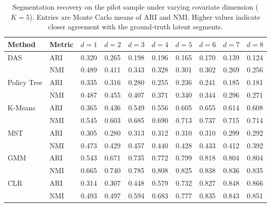 \begin{table}[htbp]
\centering
\caption{Segmentation recovery on the pilot sample under varying covariate dimension ($K=5$). Entries are Monte Carlo means of ARI and NMI. Higher values indicate closer agreement with the ground-truth latent segments.}
\label{tab:app-ari-nmi-varying-d}
\begin{tabular}{llcccccccc}
\toprule
Method & Metric & $d=1$ & $d=2$ & $d=3$ & $d=4$ & $d=5$ & $d=6$ & $d=7$ & $d=8$ \\
\midrule
DAS & ARI & 0.320 & 0.265 & 0.198 & 0.196 & 0.165 & 0.170 & 0.139 & 0.124 \\
 & NMI & 0.489 & 0.411 & 0.343 & 0.328 & 0.301 & 0.302 & 0.269 & 0.256 \\
\addlinespace
Policy Tree & ARI & 0.335 & 0.316 & 0.280 & 0.255 & 0.236 & 0.241 & 0.185 & 0.181 \\
 & NMI & 0.487 & 0.455 & 0.407 & 0.371 & 0.340 & 0.344 & 0.296 & 0.271 \\
\addlinespace
K-Means & ARI & 0.365 & 0.436 & 0.549 & 0.556 & 0.605 & 0.655 & 0.614 & 0.608 \\
 & NMI & 0.545 & 0.603 & 0.685 & 0.690 & 0.713 & 0.737 & 0.715 & 0.714 \\
\addlinespace
MST & ARI & 0.305 & 0.280 & 0.313 & 0.312 & 0.310 & 0.310 & 0.299 & 0.292 \\
 & NMI & 0.473 & 0.429 & 0.457 & 0.440 & 0.428 & 0.433 & 0.412 & 0.392 \\
\addlinespace
GMM & ARI & 0.543 & 0.671 & 0.735 & 0.772 & 0.799 & 0.818 & 0.804 & 0.804 \\
 & NMI & 0.665 & 0.740 & 0.785 & 0.808 & 0.825 & 0.838 & 0.836 & 0.835 \\
\addlinespace
CLR & ARI & 0.314 & 0.307 & 0.448 & 0.579 & 0.732 & 0.827 & 0.848 & 0.866 \\
 & NMI & 0.493 & 0.497 & 0.594 & 0.683 & 0.777 & 0.835 & 0.843 & 0.851 \\
\bottomrule
\end{tabular}
\end{table}

